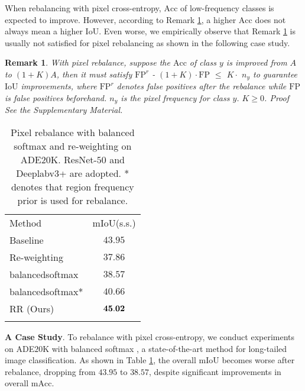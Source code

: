 \documentclass[final]{cvpr}
\newtheorem{theorem}{Remark}
\begin{document}
When rebalancing with pixel cross-entropy, $\mathrm{Acc}$ of low-frequency classes is expected to improve. However, according to Remark \ref{thm:IoU_Acc}, a higher $\mathrm{Acc}$ does not always mean a higher $\mathrm{IoU}$. Even worse, we empirically observe that Remark \ref{thm:IoU_Acc} is usually not satisfied for pixel rebalancing as shown in the following case study.


\begin{theorem}
	\label{thm:IoU_Acc}
	With pixel rebalance, suppose the $\mathrm{Acc}$ of class $y$ is improved from $A$ to $(1+K)A$, then it must satisfy $\mathrm{FP}^{r}$ - $(1+K) \cdot \mathrm{FP}$ $\leq$ $K \cdot$ $n_{y}$ to guarantee $\mathrm{IoU}$ improvements, where $\mathrm{FP}^{r}$ denotes false positives after the rebalance while $\mathrm{FP}$ is false positives beforehand. $n_{y}$ is the pixel frequency for class $y$. $K \geq 0$.
	\textit{Proof~~} See the Supplementary Material.
\end{theorem} 

\begin{table}[t]
	\centering
	\setlength{\tabcolsep}{22pt}
	\caption{Pixel rebalance with balanced softmax \cite{DBLP:conf/nips/RenYSMZYL20} and re-weighting on ADE$20$K. ResNet-$50$ and Deeplabv$3$+ are adopted. * denotes that region frequency prior is used for rebalance.}
	\label{tab:ade20k_main}
	{
		\begin{tabular}{l|c}
			\shline
			Method &$\mathrm{mIoU}$(s.s.) \\ \shline
			Baseline                 &$43.95$ \\ \shline
			Re-weighting             &$37.86$ \\balancedsoftmax          &$38.57$ \\ balancedsoftmax*         &$40.66$ \\ \hline
			RR (Ours)  &$\bf{45.02}$ \\ \shline
		\end{tabular}
	}
	\label{tab:balancesoftmax_ade20k}
\end{table}

\vspace{1mm}
\noindent\textbf{A Case Study}.
To rebalance with pixel cross-entropy, we conduct experiments on ADE$20$K with balanced softmax \cite{DBLP:conf/nips/RenYSMZYL20}, a state-of-the-art method for long-tailed image classification. As shown in Table \ref{tab:balancesoftmax_ade20k}, the overall $\mathrm{mIoU}$ becomes worse after rebalance, dropping from \textbf{$43.95$} to \textbf{$38.57$}, despite significant improvements in overall $\mathrm{mAcc}$. 
\end{document}
